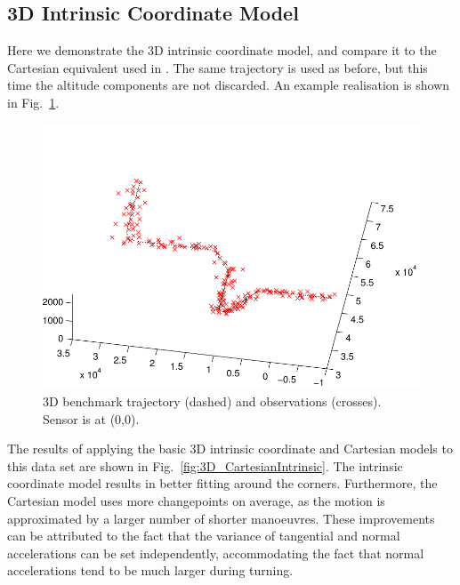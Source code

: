 \documentclass[conference]{IEEEtran}
\begin{document}
\subsection{3D Intrinsic Coordinate Model}

Here we demonstrate the 3D intrinsic coordinate model, and compare it to the Cartesian equivalent used in \cite{Whiteley2007a,Whiteley2011}. The same trajectory is used as before, but this time the altitude components are not discarded. An example realisation is shown in Fig.~\ref{fig:3D_ground_truth}.
%
\begin{figure}
\centering
\includegraphics[width=0.95\columnwidth]{images/3Dbenchmark_problem.pdf}
\caption{3D benchmark trajectory (dashed) and observations (crosses). Sensor is at (0,0).}
\label{fig:3D_ground_truth}
\end{figure}
%
The results of applying the basic 3D intrinsic coordinate and Cartesian models to this data set are shown in Fig.~\ref{fig:3D_CartesianIntrinsic}. The intrinsic coordinate model results in better fitting around the corners. Furthermore, the Cartesian model uses more changepoints on average, as the motion is approximated by a larger number of shorter manoeuvres. These improvements can be attributed to the fact that the variance of tangential and normal accelerations can be set independently, accommodating the fact that normal accelerations tend to be much larger during turning.
%
\end{document}
